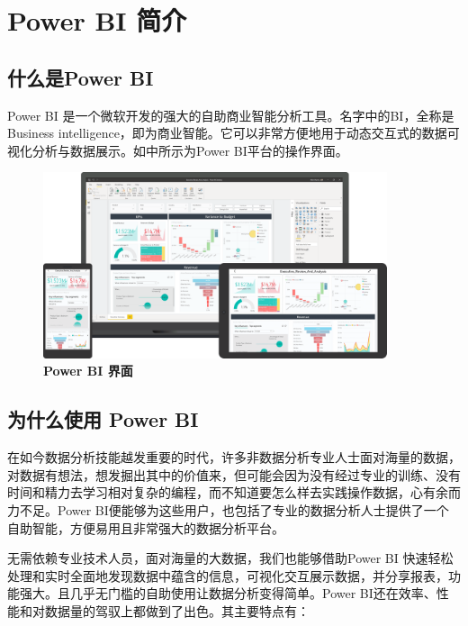 \section{Power BI 简介}

\subsection{什么是Power BI}

Power BI 是一个微软开发的强大的自助商业智能分析工具。名字中的BI，全称是Business intelligence，即为商业智能。它可以非常方便地用于动态交互式的数据可视化分析与数据展示。如中所示为Power BI平台的操作界面。

\begin{figure}[htbp]
    \centering
    \includegraphics[width=0.9\textwidth]{figure/PowerBI/powerbi.png}
    \caption{\textbf{Power BI 界面}}
    \label{fig:powerbi}
\end{figure}

\subsection{为什么使用 Power BI}

在如今数据分析技能越发重要的时代，许多非数据分析专业人士面对海量的数据，对数据有想法，想发掘出其中的价值来，但可能会因为没有经过专业的训练、没有时间和精力去学习相对复杂的编程，而不知道要怎么样去实践操作数据，心有余而力不足。Power BI便能够为这些用户，也包括了专业的数据分析人士提供了一个自助智能，方便易用且非常强大的数据分析平台。

无需依赖专业技术人员，面对海量的大数据，我们也能够借助Power BI 快速轻松处理和实时全面地发现数据中蕴含的信息，可视化交互展示数据，并分享报表，功能强大。且几乎无门槛的自助使用让数据分析变得简单。Power BI还在效率、性能和对数据量的驾驭上都做到了出色。其主要特点有：

